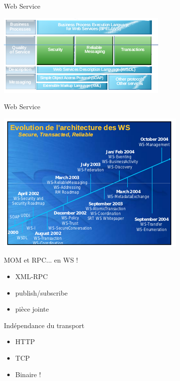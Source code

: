 {\begin{frame}{Web Service}
    \begin{center}
      \includegraphics[scale=0.8]{img/web-services.png}
    \end{center}

  \end{frame}

  \begin{frame}{Web Service}
    \begin{center}
      \includegraphics[scale=0.8]{img/ws-star.png}
    \end{center}
  \end{frame}

  \begin{frame}
    \begin{block}{MOM et RPC... en WS !}
      \begin{itemize}
        \item XML-RPC
        \item publish/subscribe
        \item pièce jointe
      \end{itemize}
    \end{block}

    \begin{block}{Indépendance du transport}
      \begin{itemize}
        \item HTTP
        \item TCP
        \item Binaire !
      \end{itemize}
    \end{block}
  \end{frame}

}
